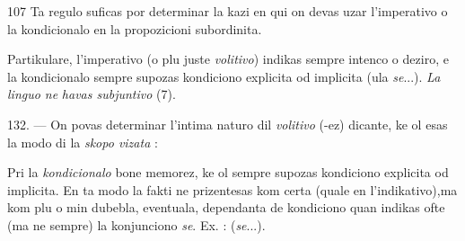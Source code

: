 \begin{VUpage}[111]{107}
Ta regulo suficas por determinar la kazi en qui on devas\nl
uzar l'imperativo o la kondicionalo en la propozicioni\nl
subordinita.

Partikulare, l'imperativo (o plu juste \textit{volitivo}) indikas\nl
sempre intenco o deziro, e la kondicionalo sempre supozas\nl
kondiciono explicita od implicita (ula \textit{se}...). \textit{La linguo ne}\nl
\textit{havas subjuntivo} (7).

\VUblanc{5.90pt}%
132. --- On povas determinar l'intima naturo dil \textit{volitivo}\nl
(-ez) dicante, ke ol esas la modo di la \textit{skopo vizata} : \nl
{}\nl
{}

Pri la \textit{kondicionalo} bone memorez, ke ol sempre supozas\nl
kondiciono explicita od implicita. En ta modo la fakti ne\nl
prizentesas kom certa (quale en l'indikativo),ma kom plu o\nl
min dubebla, eventuala, dependanta de kondiciono quan\nl
indikas ofte (ma ne sempre) la konjunciono \textit{se}. Ex. : \nl
{} (\textit{se}...).\parplein
\end{VUpage}

